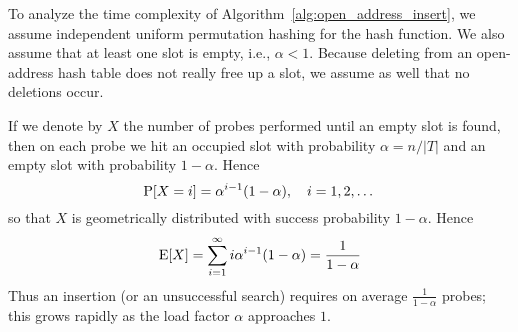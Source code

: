To analyze the time complexity of Algorithm~\ref{alg:open_address_insert}, we assume independent uniform permutation hashing for the hash function.
We also assume that at least one slot is empty, i.e., \(\alpha < 1\).
Because deleting from an open-address hash table does not really free up a slot, we assume as well that no deletions occur.

If we denote by \(X\) the number of probes performed until an empty slot is found, then on each probe we hit an occupied slot with probability \(\alpha = n/|T|\) and an empty slot with probability \(1-\alpha\).  
Hence
\[
\operatorname{P}[X=i]= \alpha^{i-1}(1-\alpha), \quad i=1,2,\dots
\]
so that \(X\) is geometrically distributed with success probability \(1-\alpha\).
Hence
\[
\operatorname{E}[X]=\sum_{i=1}^{\infty} i\alpha^{i-1}(1-\alpha)=\frac{1}{1-\alpha}
\]
Thus an insertion (or an unsuccessful search) requires on average \(\tfrac{1}{1-\alpha}\) probes; this grows rapidly as the load factor \(\alpha\) approaches \(1\).






